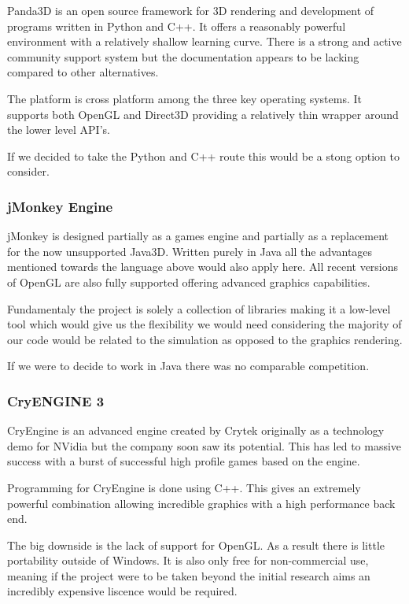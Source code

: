 Panda3D is an open source framework for 3D rendering and development
of programs written in Python and C++. It offers a reasonably powerful
environment with a relatively shallow learning curve. There is a strong
and active community support system but the documentation appears
to be lacking compared to other alternatives.

The platform is cross platform among the three key operating systems.
It supports both OpenGL and Direct3D providing a relatively thin wrapper
around the lower level API's.

If we decided to take the Python and C++ route this would be a stong
option to consider.


\subsubsection*{jMonkey Engine}

jMonkey is designed partially as a games engine and partially as a
replacement for the now unsupported Java3D. Written purely in Java
all the advantages mentioned towards the language above would also
apply here. All recent versions of OpenGL are also fully supported
offering advanced graphics capabilities.

Fundamentaly the project is solely a collection of libraries making
it a low-level tool which would give us the flexibility we would need
considering the majority of our code would be related to the simulation
as opposed to the graphics rendering.

If we were to decide to work in Java there was no comparable competition.


\subsubsection*{CryENGINE 3}

CryEngine is an advanced engine created by Crytek originally as a
technology demo for NVidia but the company soon saw its potential.
This has led to massive success with a burst of successful high profile
games based on the engine.

Programming for CryEngine is done using C++. This gives an extremely
powerful combination allowing incredible graphics with a high performance
back end.

The big downside is the lack of support for OpenGL. As a result there
is little portability outside of Windows. It is also only free for
non-commercial use, meaning if the project were to be taken beyond
the initial research aims an incredibly expensive liscence would be
required.


